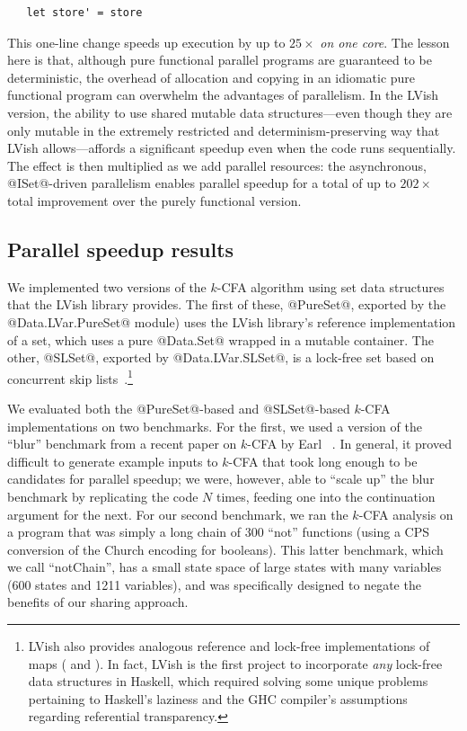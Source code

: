 \singlespacing
\begin{lstlisting}
   let store' = store 
\end{lstlisting}
\doublespacing

This one-line change speeds up execution by up to $25\times$ \emph{on
  one core}.  The lesson here is that, although pure functional
parallel programs are guaranteed to be deterministic, the overhead of
allocation and copying in an idiomatic pure functional program can
overwhelm the advantages of parallelism.  In the LVish version, the
ability to use shared mutable data structures---even though they are
only mutable in the extremely restricted and determinism-preserving
way that LVish allows---affords a significant speedup even when the
code runs sequentially.  The effect is then multiplied as we add
parallel resources: the asynchronous, @ISet@-driven parallelism
enables parallel speedup for a total of up to $202\times$ total
improvement over the purely functional version.

\subsection{Parallel speedup results}\label{subsection:lvish-parallel-speedup-results}

We implemented two versions of the $k$-CFA algorithm using set data
structures that the LVish library provides.  The first of these,
@PureSet@, exported by the @Data.LVar.PureSet@ module) uses the LVish
library's reference implementation of a set, which uses a pure
@Data.Set@ wrapped in a mutable container.  The other, @SLSet@,
exported by @Data.LVar.SLSet@, is a lock-free set based on concurrent
skip lists~\cite{art}.\footnote{LVish also provides analogous
  reference and lock-free implementations of maps ( and
  ).  In fact, LVish is the first project to incorporate
  \emph{any} lock-free data structures in Haskell, which required
  solving some unique problems pertaining to Haskell's laziness and
  the GHC compiler's assumptions regarding referential
  transparency.}

We evaluated both the @PureSet@-based and @SLSet@-based $k$-CFA
implementations on two benchmarks. For the first, we used a version of
the ``blur'' benchmark from a recent paper on $k$-CFA by Earl
\etal~\cite{earl-might-icfp-2012}.  In general, it proved difficult to
generate example inputs to $k$-CFA that took long enough to be
candidates for parallel speedup; we were, however, able to ``scale
up'' the blur benchmark by replicating the code $N$ times, feeding one
into the continuation argument for the next.  For our second
benchmark, we ran the $k$-CFA analysis on a program that was simply a
long chain of $300$ ``not'' functions (using a CPS conversion of the
Church encoding for booleans).  This latter benchmark, which we call
``notChain'', has a small state space of large states with many
variables (600 states and 1211 variables), and was specifically
designed to negate the benefits of our sharing approach.

